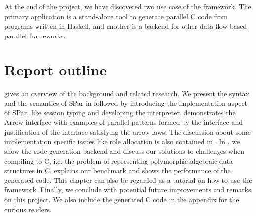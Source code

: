 At the end of the project, we have discovered two use case of the framework. The primary application is a stand-alone tool to generate parallel C code from programs written in Haskell, and another is a backend for other data-flow based parallel frameworks. 

\section{Report outline}

 gives an overview of the background and related research. We present the syntax and the semantics of SPar in  followed by  introducing the implementation aspect of SPar, like session typing and developing the interpreter.  demonstrates the Arrow interface with examples of parallel patterns formed by the interface and justification of the interface satisfying the arrow laws. The discussion about some implementation specific issues like role allocation is also contained in . In , we show the code generation backend and discuss our solutions to challenges when compiling to C, i.e. the problem of representing polymorphic algebraic data structures in C.  explains our benchmark and shows the performance of the generated code. This chapter can also be regarded as a tutorial on how to use the framework. Finally, we conclude with potential future improvements and remarks on this project. We also include the generated C code in the appendix for the curious readers.